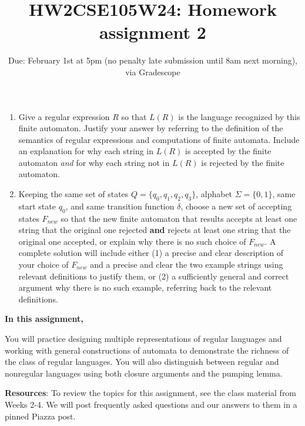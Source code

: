 \begin{enumerate}[wide, labelwidth=!, labelindent=0pt]
\begin{enumerate}
    \item Give a regular expression $R$ so that $L(R)$ is the language 
    recognized by this finite automaton. Justify your answer by referring to the 
    definition of the semantics of regular expressions and computations of finite automata. 
    Include an explanation for why each string in $L(R)$ is accepted by the finite automaton {\it and}
    for why each string not in $L(R)$ is rejected by the finite automaton.

    \item  Keeping the same set of states $Q = \{q_0, q_1, q_2, q_3\}$, alphabet $\Sigma = \{0,1\}$, 
    same start state $q_0$, and same transition 
    function $\delta$, choose a new set of accepting states $F_{new}$ so that the new 
    finite automaton that results accepts at least one string that the original one rejected {\bf and} rejects
    at least one string that the original one accepted, or explain why there is no such choice of $F_{new}$.
    A complete solution will include either (1) a precise and
    clear description of your choice of $F_{new}$
    and a precise and clear the two example strings using relevant definitions 
    to justify them, or (2) a sufficiently general and correct argument
    why there is no such example, referring back to the relevant definitions.

    \end{enumerate}
    
    \end{enumerate}
\newpage

\title{HW2CSE105W24: Homework assignment 2}
\date{Due: February 1st at 5pm (no penalty late submission until 8am next morning), via Gradescope}



\maketitle
\thispagestyle{fancy}

{\bf In this assignment,}

You will practice designing multiple representations of regular languages and working with 
general constructions of automata to demonstrate the richness of the class of regular languages.
You will also distinguish between regular and nonregular languages using both closure arguments and the pumping lemma.


{\bf Resources}: To review the topics 
for this assignment, see the class material from Weeks 2-4.
We will post frequently asked questions and our answers to them in a 
pinned Piazza post.

